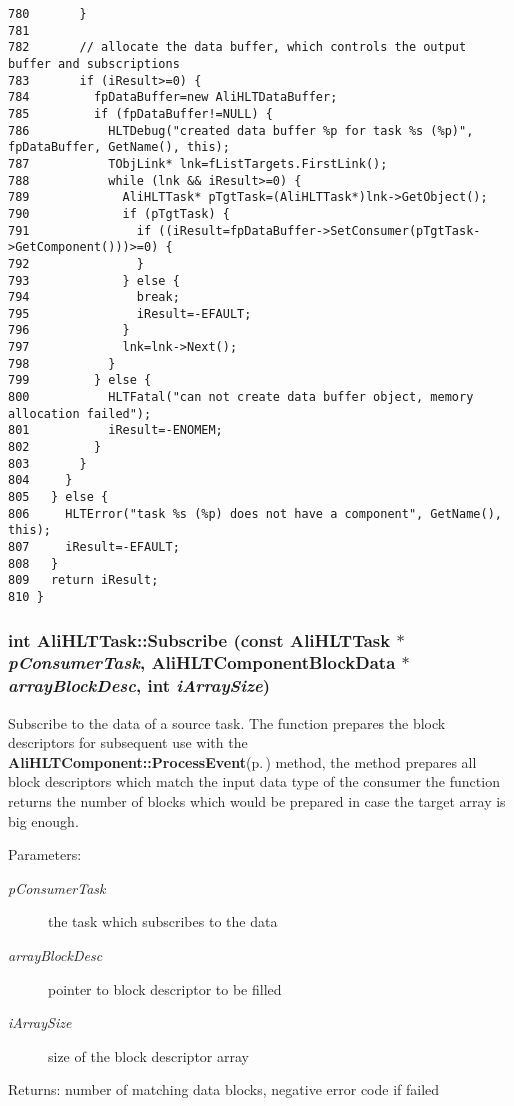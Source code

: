 \begin{verbatim}
780       }
781 
782       // allocate the data buffer, which controls the output buffer and subscriptions
783       if (iResult>=0) {
784         fpDataBuffer=new AliHLTDataBuffer;
785         if (fpDataBuffer!=NULL) {
786           HLTDebug("created data buffer %p for task %s (%p)", fpDataBuffer, GetName(), this);
787           TObjLink* lnk=fListTargets.FirstLink();
788           while (lnk && iResult>=0) {
789             AliHLTTask* pTgtTask=(AliHLTTask*)lnk->GetObject();
790             if (pTgtTask) {
791               if ((iResult=fpDataBuffer->SetConsumer(pTgtTask->GetComponent()))>=0) {
792               }
793             } else {
794               break;
795               iResult=-EFAULT;
796             }
797             lnk=lnk->Next();
798           }
799         } else {
800           HLTFatal("can not create data buffer object, memory allocation failed");
801           iResult=-ENOMEM;
802         }
803       }
804     }
805   } else {
806     HLTError("task %s (%p) does not have a component", GetName(), this);
807     iResult=-EFAULT;
808   }
809   return iResult;
810 }
\end{verbatim}\normalsize 


\subsubsection{\setlength{\rightskip}{0pt plus 5cm}int Ali\-HLTTask::Subscribe (const {\bf Ali\-HLTTask} $\ast$ {\em p\-Consumer\-Task}, {\bf Ali\-HLTComponent\-Block\-Data} $\ast$ {\em array\-Block\-Desc}, int {\em i\-Array\-Size})}\label{classAliHLTTask_a23}


Subscribe to the data of a source task. The function prepares the block descriptors for subsequent use with the {\bf Ali\-HLTComponent::Process\-Event}{\rm (p.\,\pageref{classAliHLTComponent_a6})} method, the method prepares all block descriptors which match the input data type of the consumer the function returns the number of blocks which would be prepared in case the target array is big enough. \begin{Desc}
\item[Parameters:]
\begin{description}
\item[{\em p\-Consumer\-Task}]the task which subscribes to the data \item[{\em array\-Block\-Desc}]pointer to block descriptor to be filled \item[{\em i\-Array\-Size}]size of the block descriptor array \end{description}
\end{Desc}
\begin{Desc}
\item[Returns:]number of matching data blocks, negative error code if failed \end{Desc}


